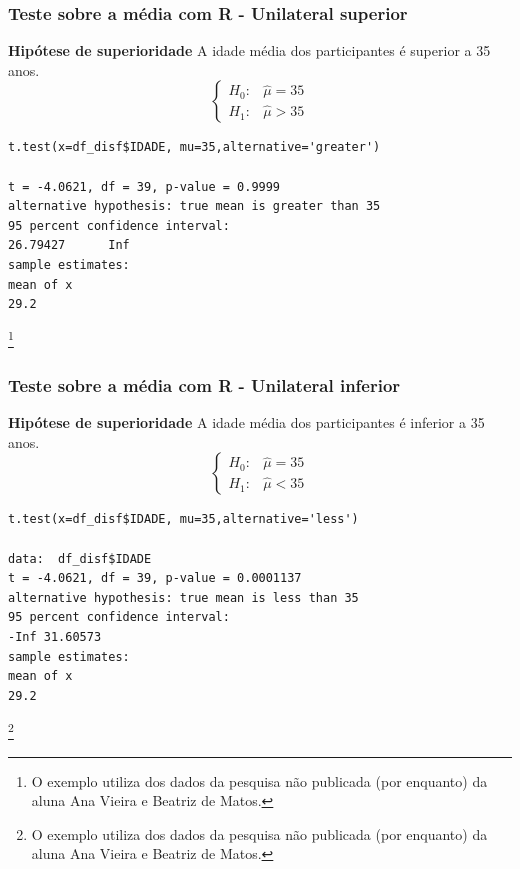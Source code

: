 \documentclass[graphics,14pt]{beamer}
\newcommand{\lfr}[1]{\let\thefootnote\relax\footnote{\hspace{0.6cm}\vspace{1.25cm} #1}}
\begin{document}
\begin{frame}[t,fragile=singleslide]
\frametitle{Teste sobre a média com R - Unilateral superior}
\textbf{Hipótese de superioridade}
A idade média dos participantes é superior a 35 anos.
\begin{equation*}
\left\{ \begin{array}{cl}
H_0: & \hat{\mu} = 35 \\
H_1: & \hat{\mu} > 35
\end{array}\right.
\end{equation*}

\begin{lstlisting}
t.test(x=df_disf$IDADE, mu=35,alternative='greater')

t = -4.0621, df = 39, p-value = 0.9999
alternative hypothesis: true mean is greater than 35
95 percent confidence interval:
26.79427      Inf
sample estimates:
mean of x 
29.2 
\end{lstlisting}

\lfr{O exemplo utiliza dos dados da pesquisa não publicada (por enquanto) da aluna Ana Vieira e Beatriz de Matos.}

\end{frame}
\begin{frame}[t,fragile=singleslide]
\frametitle{Teste sobre a média com R  - Unilateral inferior}
\textbf{Hipótese de superioridade}
A idade média dos participantes é inferior a 35 anos.
\begin{equation*}
\left\{ \begin{array}{cl}
H_0: & \hat{\mu} = 35 \\
H_1: & \hat{\mu} < 35
\end{array}\right.
\end{equation*}

\begin{lstlisting}
t.test(x=df_disf$IDADE, mu=35,alternative='less')

data:  df_disf$IDADE
t = -4.0621, df = 39, p-value = 0.0001137
alternative hypothesis: true mean is less than 35
95 percent confidence interval:
-Inf 31.60573
sample estimates:
mean of x 
29.2 
\end{lstlisting}

\lfr{O exemplo utiliza dos dados da pesquisa não publicada (por enquanto) da aluna Ana Vieira e Beatriz de Matos.}

\end{frame}
\end{document}
